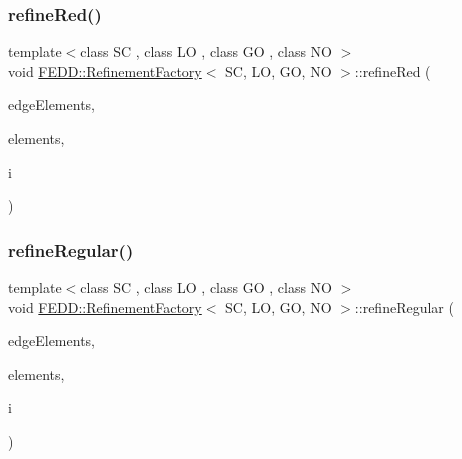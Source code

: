 \mbox{\label{classFEDD_1_1RefinementFactory_ad8bc07f5d6bfe7f7180bd32d7cc4ea0c}} 
\subsubsection{\texorpdfstring{refine\+Red()}{refineRed()}}
{\footnotesize\ttfamily template$<$class SC , class LO , class GO , class NO $>$ \\
void \hyperlink{classFEDD_1_1RefinementFactory}{F\+E\+D\+D\+::\+Refinement\+Factory}$<$ SC, LO, GO, NO $>$\+::refine\+Red (\begin{DoxyParamCaption}\item[{\hyperlink{classFEDD_1_1RefinementFactory_ae5285e990ec4632d6188a1280627ad13}{Edge\+Elements\+Ptr\+\_\+\+Type}}]{edge\+Elements,  }\item[{\hyperlink{classFEDD_1_1RefinementFactory_a0994b5b7b6d080048673941251999f2e}{Elements\+Ptr\+\_\+\+Type}}]{elements,  }\item[{int}]{i }\end{DoxyParamCaption})}

\mbox{\label{classFEDD_1_1RefinementFactory_a530ccd6a31c259515ab1900d544eb813}} 
\subsubsection{\texorpdfstring{refine\+Regular()}{refineRegular()}}
{\footnotesize\ttfamily template$<$class SC , class LO , class GO , class NO $>$ \\
void \hyperlink{classFEDD_1_1RefinementFactory}{F\+E\+D\+D\+::\+Refinement\+Factory}$<$ SC, LO, GO, NO $>$\+::refine\+Regular (\begin{DoxyParamCaption}\item[{\hyperlink{classFEDD_1_1RefinementFactory_ae5285e990ec4632d6188a1280627ad13}{Edge\+Elements\+Ptr\+\_\+\+Type}}]{edge\+Elements,  }\item[{\hyperlink{classFEDD_1_1RefinementFactory_a0994b5b7b6d080048673941251999f2e}{Elements\+Ptr\+\_\+\+Type}}]{elements,  }\item[{int}]{i }\end{DoxyParamCaption})}

